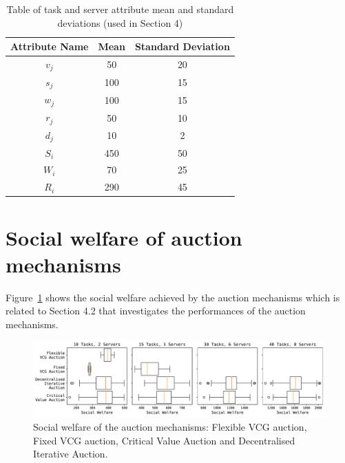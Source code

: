 \documentclass[sigconf]{aamas}
\begin{document}
\begin{table}[h]
    \centering
    \caption{Table of task and server attribute mean and standard deviations (used in Section 4)}
    \label{tab:synthetic-model-settings}
    \begin{tabular}{|c|c|c|}
        \hline
        Attribute Name & Mean & Standard Deviation \\ \hline
        $v_j$          & 50   & 20                 \\ \hline
        $s_j$          & 100  & 15                 \\ \hline
        $w_j$          & 100  & 15                 \\ \hline
        $r_j$          & 50   & 10                 \\ \hline
        $d_j$          & 10   & 2                  \\ \hline
        $S_i$          & 450  & 50                 \\ \hline
        $W_i$          & 70   & 25                 \\ \hline
        $R_i$          & 290  & 45                 \\ \hline
    \end{tabular}
\end{table}

\section{Social welfare of auction mechanisms}
Figure~\ref{fig:auction-mechanims-social-welfare} shows the social welfare achieved by the auction mechanisms which is related to Section 4.2 that investigates the performances of the auction mechanisms.
\begin{figure}[ht]
    \centering
    \includegraphics[width=\linewidth]{figs/auctions/social_welfare.pdf}
    \caption{Social welfare of the auction mechanisms: Flexible VCG auction, Fixed VCG auction, Critical Value Auction and Decentralised Iterative Auction.}
    \label{fig:auction-mechanims-social-welfare}
\end{figure}

 

\end{document}
